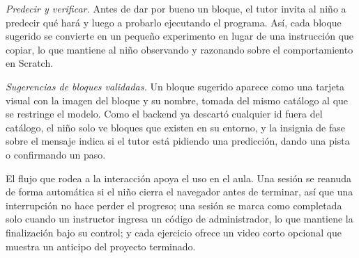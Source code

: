 \documentclass[conference]{IEEEtran}
\begin{document}
\emph{Predecir y verificar.} Antes de dar por bueno un bloque, el tutor invita al niño a predecir qué hará y luego a probarlo ejecutando el programa. Así, cada bloque sugerido se convierte en un pequeño experimento en lugar de una instrucción que copiar, lo que mantiene al niño observando y razonando sobre el comportamiento en Scratch.

\emph{Sugerencias de bloques validadas.} Un bloque sugerido aparece como una tarjeta visual con la imagen del bloque y su nombre, tomada del mismo catálogo al que se restringe el modelo. Como el backend ya descartó cualquier id fuera del catálogo, el niño solo ve bloques que existen en su entorno, y la insignia de fase sobre el mensaje indica si el tutor está pidiendo una predicción, dando una pista o confirmando un paso.

El flujo que rodea a la interacción apoya el uso en el aula. Una sesión se reanuda de forma automática si el niño cierra el navegador antes de terminar, así que una interrupción no hace perder el progreso; una sesión se marca como completada solo cuando un instructor ingresa un código de administrador, lo que mantiene la finalización bajo su control; y cada ejercicio ofrece un video corto opcional que muestra un anticipo del proyecto terminado.
\end{document}
